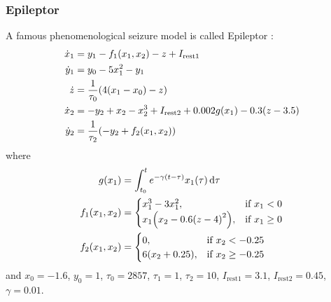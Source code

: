 \documentclass[hyperref={hidelinks}]{beamer}
\begin{document}
\begin{frame}
  \frametitle{Epileptor}
  {\footnotesize
    A famous phenomenological seizure model is called Epileptor \cite{Jirsa2014}:
    \begin{align}
      \label{eq:epileptor_x1}
      \dot{x}_{1}
      &=
        y_{1}
        -
        f_{1}(x_{1}, x_{2})
        -
        z
        +
        I_{\text{rest} 1} \\
      \label{eq:epileptor_y1}
      \dot{y}_{1}
      &=
        y_{0}
        -
        5 x_{1}^{2}
        -
        y_{1} \\
      \label{eq:epileptor_z}
      \dot{z}
      &=
        \frac{1}{\tau_{0}} \pqty{4 \pqty{x_{1} - x_{0}} - z} \\
      \label{eq:epileptor_x2}
      \dot{x}_{2}
      &=
        -y_{2}
        +
        x_{2}
        -
        x_{2}^{3}
        +
        I_{\text{rest} 2}
        +
        0.002 g(x_{1})
        -
        0.3 \pqty{z - 3.5} \\
      \label{eq:epileptor_y2}
      \dot{y}_{2}
      &=
        \frac{1}{\tau_{2}} \pqty{-y_{2} + f_{2}(x_{1}, x_{2})}
    \end{align}
  }
  where
  {\tiny
    \begin{align}
      \label{eq:epileptor_g}
      g(x_{1})
      &=
        \int_{t_{0}}^{t}{e^{-\gamma \pqty{t - \tau}} x_{1}(\tau) \dd{\tau}} \\
      \label{eq:epileptor_f1}
      f_{1}(x_{1}, x_{2})
      &=
        \begin{cases}
          x_{1}^{3} - 3 x_{1}^{2},
          & \text{if } x_{1} < 0 \\
          x_{1} \pqty{x_{2} - 0.6 \pqty{z - 4}^{2}},
          & \text{if }
          x_{1} \geq 0
        \end{cases} \\
      \label{eq:epileptor_f2}
      f_{2}(x_{1}, x_{2})
      &=
        \begin{cases}
          0,
          & \text{if } x_{2} < -0.25 \\
          6 \pqty{x_{2} + 0.25},
          & \text{if } x_{2} \geq -0.25
        \end{cases}
    \end{align}
  }
  {\footnotesize
    and $x_{0} = -1.6$, $y_{0} = 1$, $\tau_{0} = 2857$, $\tau_{1} = 1$, $\tau_{2} = 10$, $I_{\text{rest} 1} = 3.1$, $I_{\text{rest} 2} = 0.45$, $\gamma = 0.01$.
  }

\end{frame}
\end{document}
